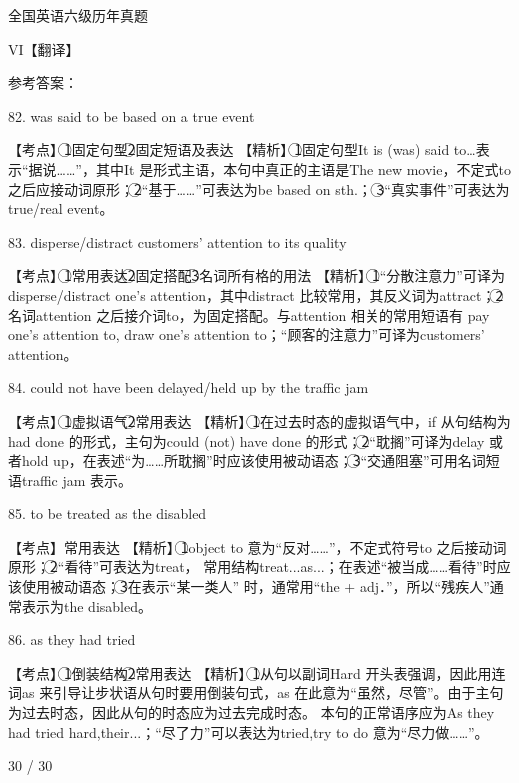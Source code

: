 \documentclass[UTF8,11pt]{ctexart}
\begin{document}
全国英语六级历年真题


VI【翻译】


参考答案：


82. was said to be based on a true event


【考点】\textcircled{1}固定句型\textcircled{2}固定短语及表达 【精析】\textcircled{1}固定句型It is (was) said to…表示“据说……”，其中It 是形式主语，本句中真正的主语是The new movie，不定式to 之后应接动词原形；\textcircled{2}“基于……”可表达为be based on sth.； \textcircled{3}“真实事件”可表达为true/real event。


83. disperse/distract customers' attention to its quality


【考点】\textcircled{1}常用表达\textcircled{2}固定搭配\textcircled{3}名词所有格的用法 【精析】\textcircled{1}“分散注意力”可译为disperse/distract one's attention，其中distract 比较常用，其反义词为attract；\textcircled{2}名词attention 之后接介词to，为固定搭配。与attention 相关的常用短语有 pay one's attention to, draw one's attention to；“顾客的注意力”可译为customers' attention。


84. could not have been delayed/held up by the traffic jam


【考点】\textcircled{1}虚拟语气\textcircled{2}常用表达 【精析】\textcircled{1}在过去时态的虚拟语气中，if 从句结构为had done 的形式，主句为could (not) have done 的形式；\textcircled{2}“耽搁”可译为delay 或者hold up，在表述“为……所耽搁”时应该使用被动语态；\textcircled{3}“交通阻塞”可用名词短语traffic jam 表示。


85. to be treated as the disabled


【考点】常用表达 【精析】\textcircled{1}object to 意为“反对……”，不定式符号to 之后接动词原形；\textcircled{2}“看待”可表达为treat， 常用结构treat...as...；在表述“被当成……看待”时应该使用被动语态；\textcircled{3}在表示“某一类人” 时，通常用“the + adj．”，所以“残疾人”通常表示为the disabled。


86. as they had tried


【考点】\textcircled{1}倒装结构\textcircled{2}常用表达 【精析】\textcircled{1}从句以副词Hard 开头表强调，因此用连词as 来引导让步状语从句时要用倒装句式，as 在此意为“虽然，尽管”。由于主句为过去时态，因此从句的时态应为过去完成时态。 本句的正常语序应为As they had tried hard,their...；“尽了力”可以表达为tried,try to do 意为“尽力做……”。


30 / 30
\end{document}
